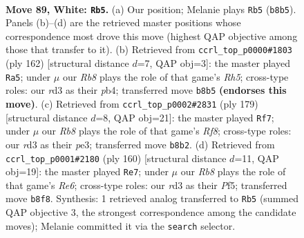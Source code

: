 \documentclass[11pt]{article}
\begin{document}
\clearpage

\begin{figure}[p]\centering
\begin{subfigure}{0.46\textwidth}\centering
\resizebox{\linewidth}{!}{%
\newchessgame
\chessboard[
  setfen={1R6/2k5/8/6K1/r6P/3r4/8/8 w - - 19 89},
  showmover=false,
  pgfstyle=straightmove, color=movearrow, markmove={b8-b5}
]}
\caption{}
\end{subfigure}\hfill
\begin{subfigure}{0.46\textwidth}\centering
\resizebox{\linewidth}{!}{%
\newchessgame
\chessboard[
  setfen={8/8/3k4/7R/1p3K2/2r3P1/8/8 w - - 3 82},
  showmover=false,
  pgfstyle=straightmove, color=movearrow, markmove={h5-a5}
]}
\caption{}
\end{subfigure}
\\[4pt]
\begin{subfigure}{0.46\textwidth}\centering
\resizebox{\linewidth}{!}{%
\newchessgame
\chessboard[
  setfen={8/8/8/4R3/4p3/3kP3/6K1/5r2 b - - 1 90},
  showmover=false,
  pgfstyle=straightmove, color=movearrow, markmove={f1-f7}
]}
\caption{}
\end{subfigure}\hfill
\begin{subfigure}{0.46\textwidth}\centering
\resizebox{\linewidth}{!}{%
\newchessgame
\chessboard[
  setfen={8/8/4R3/3k1P1p/7K/5r2/8/8 w - - 1 81},
  showmover=false,
  pgfstyle=straightmove, color=movearrow, markmove={e6-e7}
]}
\caption{}
\end{subfigure}
\caption{\textbf{Move 89, White: \texttt{Rb5}.} (a) Our position; Melanie plays \texttt{Rb5} (\texttt{b8b5}). Panels (b)--(d) are the retrieved master positions whose correspondence most drove this move (highest QAP objective among those that transfer to it). (b) Retrieved from \texttt{ccrl\_top\_p0000\#1803} (ply 162) [structural distance $d$=7, QAP obj=3]: the master played \texttt{Ra5}; under $\mu$ our \emph{Rb8} plays the role of that game's \emph{Rh5}; cross-type roles: our \emph{r}d3 as their \emph{p}b4; transferred move \texttt{b8b5} \textbf{(endorses this move)}. (c) Retrieved from \texttt{ccrl\_top\_p0002\#2831} (ply 179) [structural distance $d$=8, QAP obj=21]: the master played \texttt{Rf7}; under $\mu$ our \emph{Rb8} plays the role of that game's \emph{Rf8}; cross-type roles: our \emph{r}d3 as their \emph{p}e3; transferred move \texttt{b8b2}. (d) Retrieved from \texttt{ccrl\_top\_p0001\#2180} (ply 160) [structural distance $d$=11, QAP obj=19]: the master played \texttt{Re7}; under $\mu$ our \emph{Rb8} plays the role of that game's \emph{Re6}; cross-type roles: our \emph{r}d3 as their \emph{P}f5; transferred move \texttt{b8f8}. Synthesis: 1 retrieved analog transferred to \texttt{Rb5} (summed QAP objective 3, the strongest correspondence among the candidate moves); Melanie committed it via the \texttt{search} selector.}
\label{fig:thought-m176}
\end{figure}
\end{document}
